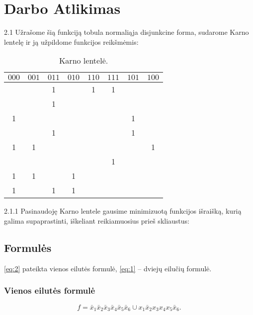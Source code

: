 \documentclass[12pt]{article}
\begin{document}
\section{Darbo Atlikimas}

2.1 Užrašome šią funkciją tobula normaliąja disjunkcine forma, sudarome Karno lentelę ir ją užpildome funkcijos reikšmėmis:
	


\begin{table}[!htbp]
	\caption{Karno lentelė.}
	\centering
	\begin{tabular}{|c|c|c|c|c|c|c|c|}
		\hline
		$000$ & $001$ & $011$ & $010$ & $110$ & $111$ & $101$ & $100$ \\
		\hline
		 &  & 1 &  & 1 & 1 &  & \\
		 &  & 1 &  &  &  &  & \\
		1 &  &  &  &  &  & 1 &\\
		 &  & 1 & & &  & 1 &\\
		 1&1&&&&&&1 \\
		 &&&&&1&& \\
		 1&1&&1&&&& \\
		 1&&1&1&&&& \\
		\hline
	\end{tabular}
\end{table}

2.1.1 Pasinaudoję Karno lentele gausime minimizuotą funkcijos išraišką, kurią galima supaprastinti, iškeliant reikiamuosius prieš skliaustus:
	
	
	
	
	
	
	
	

\subsection{Formulės} \label{formules}
\eqref{eq:2} pateikta vienos eilutės formulė, \eqref{eq:1} -- dviejų eilučių formulė.

\subsubsection{Vienos eilutės formulė} \label{vienos}
\begin{equation}
	f = \bar{x}_{1}\bar{x}_{2}\bar{x}_{3}\bar{x}_{4}\bar{x}_{5}\bar{x}_{6}\cup x_{1}\bar{x}_{2} x_{3} x_{4} x_{5}\bar{x}_{6}. \label{eq:2}
\end{equation}
\end{document}
